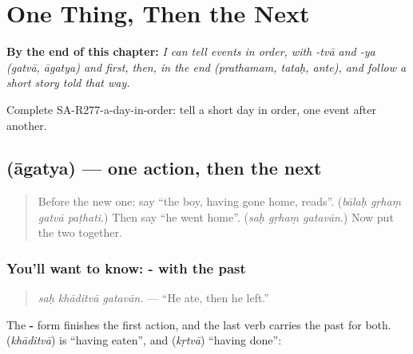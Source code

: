 
\chapter{One Thing, Then the Next}
\label{ch:sa-one-thing-then-the-next}

\begin{chapteropening}
\textbf{By the end of this chapter:} \emph{I can tell events in order, with -tvā and -ya (gatvā, āgatya) and first, then, in the end (prathamam, tataḥ, ante), and follow a short story told that way.}

Complete SA-R277-a-day-in-order: tell a short day in order, one event after another.
\end{chapteropening}

\section[\texorpdfstring{\sk{आगत्य} (āgatya)}{आगत्य (āgatya)}]{ (āgatya) — one action, then the next}

\label{lesson:SA-C277-agatya}



\begin{quote}
Before the new one: say \textquotedblleft{}the boy, having gone home, reads\textquotedblright{}. (\emph{bālaḥ gṛhaṃ gatvā paṭhati}.) Then say \textquotedblleft{}he went home\textquotedblright{}. (\emph{saḥ gṛhaṃ gatavān}.) Now put the two together.
\end{quote}

\subsection*{You'll want to know: - with the past}
\begin{quote}
\textbf{  }
\end{quote}

\begin{quote}
\emph{saḥ khāditvā gatavān.} — \textquotedblleft{}He ate, then he left.\textquotedblright{}
\end{quote}

The \textbf{-} form finishes the first action, and the last verb carries the past for both. \textbf{} (\emph{khāditvā}) is \textquotedblleft{}having eaten\textquotedblright{}, and \textbf{} (\emph{kṛtvā}) \textquotedblleft{}having done\textquotedblright{}:

